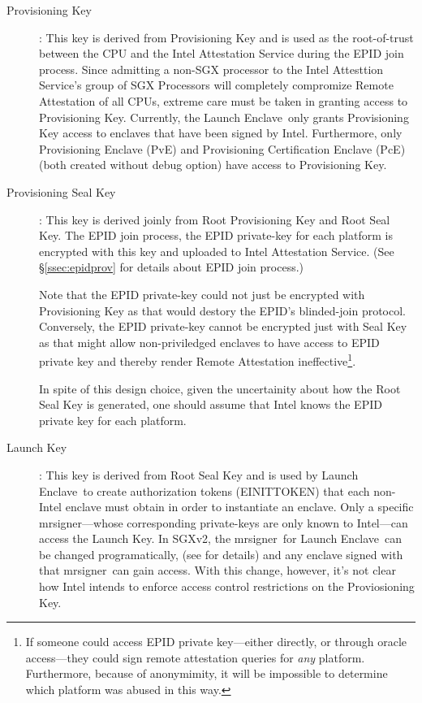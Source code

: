 \documentclass[10pt]{article}
\newcommand{\secref}[1]{\S\ref{#1}}
\newcommand{\mrsigner}{\textsf{mrsigner}}
\newcommand{\pve}{\textsf{PvE}}
\newcommand{\pce}{\textsf{PcE}}
\newcommand{\launchenclave}{\textsf{Launch Enclave}}
\begin{document}
  \begin{description}
    \item[Provisioning Key]: This key is derived from
      Provisioning Key and is used as the root-of-trust
      between the CPU and the Intel Attestation Service during the
      EPID join process. Since admitting a non-SGX processor to
      the Intel Attesttion Service's group of SGX Processors will
      completely compromize Remote Attestation of all CPUs, extreme
      care must be taken in granting access to Provisioning Key.
      Currently, the \launchenclave\ only grants Provisioning Key
      access to enclaves that have been signed by Intel. Furthermore,
      only Provisioning Enclave (\pve) and Provisioning Certification
      Enclave (\pce) (both created without debug option) have access to
      Provisioning Key.

    \item[Provisioning Seal Key]: This key is derived joinly from Root
      Provisioning Key and Root Seal Key. The EPID join process, the
      EPID private-key for each platform is encrypted with this key
      and uploaded to Intel Attestation Service. (See \secref{ssec:epidprov}
      for details about EPID join process.)

      Note that the EPID private-key could not just be encrypted with
      Provisioning Key as that would destory the EPID's blinded-join
      protocol. Conversely, the EPID private-key cannot be encrypted
      just with Seal Key as that might allow non-priviledged enclaves
      to have access to EPID private key and thereby render Remote
      Attestation ineffective\footnote{If someone could access EPID
      private key---either directly, or through oracle access---they
      could sign remote attestation queries for \textit{any}
      platform. Furthermore, because of anonymimity, it will be
      impossible to determine which platform was abused in this way.}.

      In spite of this design choice, given the uncertainity about
      how the Root Seal Key is generated, one should assume that
      Intel knows the EPID private key for each platform.

      \item[Launch Key]: This key is derived from Root Seal Key and
      is used by \launchenclave\ to create authorization tokens
      (\textsf{EINITTOKEN}) that each non-Intel enclave must obtain
      in order to instantiate an enclave. Only a specific
      \mrsigner---whose corresponding private-keys are only known
      to Intel---can access the Launch Key. In SGXv2, the \mrsigner\
      for \launchenclave\ can be changed programatically,
      (see \cite[\S39.1.4]{intelsdm} for details) and any enclave
      signed with that \mrsigner\ can gain access. With
      this change, however, it's not clear how Intel intends
      to enforce access control restrictions on the
      Proviosioning Key.


\end{description}
\end{document}

